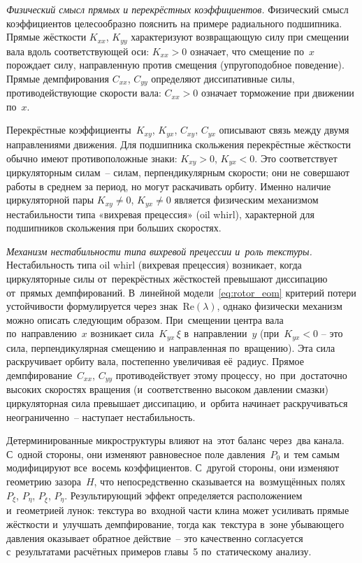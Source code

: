 \textit{Физический смысл прямых и перекрёстных коэффициентов.}
Физический смысл коэффициентов целесообразно пояснить
на примере радиального подшипника. Прямые
жёсткости $K_{xx}$, $K_{yy}$ характеризуют возвращающую силу
при смещении вала вдоль соответствующей оси: $K_{xx} > 0$
означает, что смещение по~$x$ порождает силу, направленную
против смещения (упругоподобное поведение). Прямые
демпфирования $C_{xx}$, $C_{yy}$ определяют диссипативные
силы, противодействующие скорости вала: $C_{xx} > 0$ означает
торможение при движении по~$x$.

Перекрёстные коэффициенты~$K_{xy}$, $K_{yx}$, $C_{xy}$,
$C_{yx}$ описывают связь между двумя направлениями движения.
Для подшипника скольжения перекрёстные жёсткости обычно имеют
противоположные знаки: $K_{xy} > 0$, $K_{yx} < 0$. Это
соответствует циркуляторным силам~-- силам, перпендикулярным
скорости; они не совершают работы в среднем за период,
но могут раскачивать орбиту. Именно наличие циркуляторной пары
$K_{xy} \neq 0$, $K_{yx} \neq 0$ является физическим
механизмом нестабильности типа «вихревая прецессия»
(oil whirl), характерной для подшипников скольжения при
больших скоростях.

\textit{Механизм нестабильности типа вихревой прецессии и~роль текстуры.}
Нестабильность типа oil whirl (вихревая прецессия) возникает, когда циркуляторные силы от~перекрёстных жёсткостей превышают диссипацию от~прямых демпфирований. В~линейной модели~\eqref{eq:rotor_eom} критерий потери устойчивости формулируется через знак~$\mathrm{Re}(\lambda)$, однако физически механизм можно описать следующим образом. При~смещении центра вала по~направлению~$x$ возникает сила~$K_{yx}\,\xi$ в~направлении~$y$ (при~$K_{yx} < 0$ -- это сила, перпендикулярная смещению и~направленная по~вращению). Эта сила раскручивает орбиту вала, постепенно увеличивая её~радиус. Прямое демпфирование~$C_{xx}$, $C_{yy}$ противодействует этому процессу, но~при~достаточно высоких скоростях вращения (и~соответственно высоком давлении смазки) циркуляторная сила превышает диссипацию, и~орбита начинает раскручиваться неограниченно~-- наступает нестабильность.

Детерминированные микроструктуры влияют на~этот баланс через~два канала. С~одной стороны, они изменяют равновесное поле давления~$P_0$ и~тем самым модифицируют все~восемь коэффициентов. С~другой стороны, они изменяют геометрию зазора~$H$, что непосредственно сказывается на~возмущённых полях~$P_\xi$, $P_\eta$, $P_{\dot\xi}$, $P_{\dot\eta}$. Результирующий эффект определяется расположением и~геометрией лунок: текстура во~входной части клина может усиливать прямые жёсткости и~улучшать демпфирование, тогда как~текстура в~зоне убывающего давления оказывает обратное действие~-- это качественно согласуется с~результатами расчётных примеров главы~5 по~статическому анализу.

